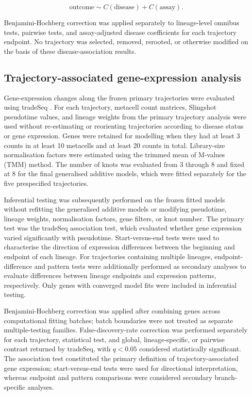 \documentclass[10pt,letterpaper]{article}
\begin{document}
$$
\mathrm{outcome} \sim C(\mathrm{disease}) + C(\mathrm{assay}).
$$

Benjamini-Hochberg correction was applied separately to lineage-level omnibus tests, pairwise tests, and assay-adjusted disease coefficients for each trajectory endpoint. No trajectory was selected, removed, rerooted, or otherwise modified on the basis of these disease-association results.

\subsection*{Trajectory-associated gene-expression analysis}

Gene-expression changes along the frozen primary trajectories were evaluated using tradeSeq \cite{vandenbergeTrajectoryBasedDifferential2020}. For each trajectory, metacell count matrices, Slingshot pseudotime values, and lineage weights from the primary trajectory analysis were used without re-estimating or reorienting trajectories according to disease status or gene expression. Genes were retained for modelling when they had at least 3 counts in at least 10 metacells and at least 20 counts in total. Library-size normalisation factors were estimated using the trimmed mean of M-values (TMM) method. The number of knots was evaluated from 3 through 8 and fixed at 8 for the final generalised additive models, which were fitted separately for the five prespecified trajectories.

Inferential testing was subsequently performed on the frozen fitted models without refitting the generalised additive models or modifying pseudotime, lineage weights, normalisation factors, gene filters, or knot number. The primary test was the tradeSeq association test, which evaluated whether gene expression varied significantly with pseudotime. Start-versus-end tests were used to characterise the direction of expression differences between the beginning and endpoint of each lineage. For trajectories containing multiple lineages, endpoint-difference and pattern tests were additionally performed as secondary analyses to evaluate differences between lineage endpoints and expression patterns, respectively. Only genes with converged model fits were included in inferential testing.

Benjamini-Hochberg correction was applied after combining genes across computational fitting batches; batch boundaries were not treated as separate multiple-testing families. False-discovery-rate correction was performed separately for each trajectory, statistical test, and global, lineage-specific, or pairwise contrast returned by tradeSeq, with $q<0.05$ considered statistically significant. The association test constituted the primary definition of trajectory-associated gene expression; start-versus-end tests were used for directional interpretation, whereas endpoint and pattern comparisons were considered secondary branch-specific analyses.
\end{document}
